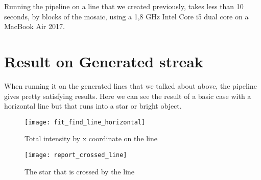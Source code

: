 \documentclass[a4paper,12pt,oneside]{report}
\begin{document}
Running the pipeline on a line that we created previously, takes less than 10 seconds, by blocks of the mosaic, using a 1,8 GHz Intel Core i5 dual core
on a MacBook Air 2017. 

\section{Result on Generated streak}
When running it on the generated lines that we talked about above, the pipeline gives pretty satisfying results. Here we can see the result 
of a basic case with a horizontal line but that  runs into a star or bright object.
\begin{figure}[h]
    \begin{minipage}[c]{.47\linewidth}
        \centering
        \texttt{[image: fit\_find\_line\_horizontal]}
        \caption{Total intensity by x coordinate on the line}
        \label{graphHorizontalLine}
    \end{minipage}
    \hfill
    \begin{minipage}[c]{.47\linewidth}
        \centering
        \texttt{[image: report\_crossed\_line]}
        \caption{The star that is crossed by the line}
    \end{minipage}
\end{figure}
\end{document}
